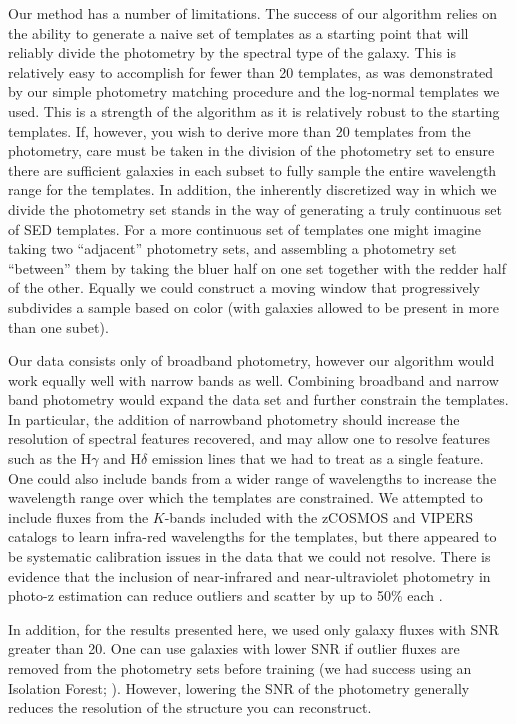 \documentclass[twocolumn]{aastex63}
\begin{document}
    Our method has a number of limitations.
    The success of our algorithm relies on the ability to generate a naive set of templates as a starting point that will reliably divide the photometry by the spectral type of the galaxy. 
    This is relatively easy to accomplish for fewer than 20 templates, as was demonstrated by our simple photometry matching procedure and the log-normal templates we used.
    This is a strength of the algorithm as it is relatively robust to the starting templates. If, however, you wish to derive more than 20 templates from the photometry, care must be taken in the division of the photometry set to ensure there are sufficient galaxies in each subset to fully sample the entire wavelength range for the templates.
    In addition, the inherently discretized way in which we divide the photometry set stands in the way of generating a truly continuous set of SED templates.
    For a more continuous set of templates one might imagine taking two ``adjacent'' photometry sets, and assembling a photometry set ``between'' them by taking the bluer half on one set together with the redder half of the other. 
    Equally we could construct a moving window that progressively subdivides a sample based on color (with galaxies allowed to be present in more than one subet).

    Our data consists only of broadband photometry, however our algorithm would work equally well with narrow bands as well.
    Combining broadband and narrow band photometry would expand the data set and further constrain the templates.
    In particular, the addition of narrowband photometry should increase the resolution of spectral features recovered, and may allow one to resolve features such as the H$\gamma$ and H$\delta$ emission lines that we had to treat as a single feature.
    One could also include bands from a wider range of wavelengths to increase the wavelength range over which the templates are constrained.
    We attempted to include fluxes from the $K$-bands included with the zCOSMOS and VIPERS catalogs to learn  infra-red wavelengths for the templates, but there appeared to be systematic calibration issues in the data that we could not resolve.
    There is evidence that the inclusion of near-infrared and near-ultraviolet photometry in photo-z estimation can reduce outliers and scatter by up to 50\% each \citep{Graham2020}.

    In addition, for the results presented here, we used only galaxy fluxes with SNR greater than 20.
    One can use galaxies with lower SNR if outlier fluxes are removed from the photometry sets before training (we had success using an Isolation Forest; \citealt{Ting2008,Liu2012}).
    However, lowering the SNR of the photometry generally reduces the resolution of the structure you can reconstruct.
\end{document}
